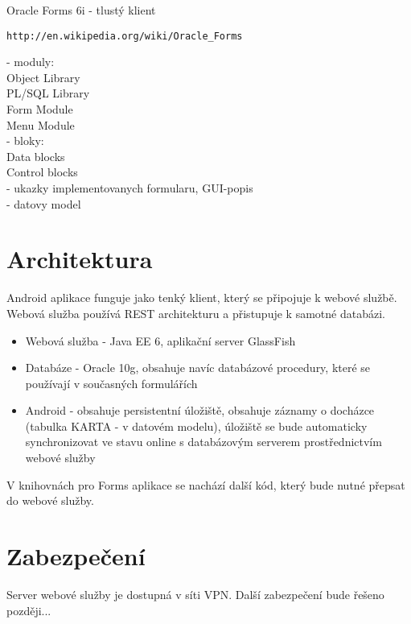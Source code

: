 \documentclass{bakalarka}
\begin{document}
Oracle Forms 6i - tlustý klient \\
\begin{verbatim}
http://en.wikipedia.org/wiki/Oracle_Forms
\end{verbatim}

- moduly:\\
Object Library\\
PL/SQL Library  \\
Form Module   \\
Menu Module\\
- bloky:\\
Data blocks\\
Control blocks\\

- ukazky implementovanych formularu, GUI-popis\\
- datovy model\\

\section{Architektura}
Android aplikace funguje jako tenký klient, který se připojuje k webové službě. Webová služba používá REST architekturu a přistupuje k samotné databázi.

\begin{itemize}
\item Webová služba - Java EE 6, aplikační server GlassFish
\item Databáze - Oracle 10g, obsahuje navíc databázové procedury, které se používají v současných formulářích  
\item Android - obsahuje persistentní úložiště, obsahuje záznamy o docházce (tabulka KARTA - v datovém modelu), úložiště se bude automaticky synchronizovat ve stavu online s databázovým serverem prostřednictvím webové služby
\end{itemize}

V knihovnách pro Forms aplikace se nachází další kód, který bude nutné přepsat do webové služby.

\section{Zabezpečení}
Server webové služby je dostupná v síti VPN. Další zabezpečení bude řešeno později...
\end{document}
